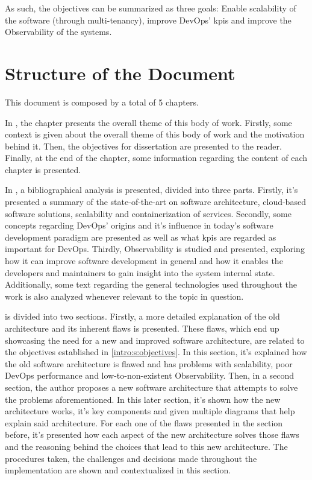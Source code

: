 As such, the objectives can be summarized as three goals: Enable scalability of the software (through multi-tenancy), improve DevOps' \glspl{kpi} and improve the Observability of the systems.


\section{Structure of the Document}\label{intro:s:structure-of-the-document}

This document is composed by a total of 5 chapters.

In , the chapter presents the overall theme of this body of work. Firstly, some context is given about the overall theme of this body of work and the motivation behind it. Then, the objectives for dissertation are presented to the reader. Finally, at the end of the chapter, some information regarding the content of each chapter is presented.

In , a bibliographical analysis is presented, divided into three parts. Firstly, it's presented a summary of the state-of-the-art on software architecture, cloud-based software solutions, scalability and containerization of services. Secondly, some concepts regarding DevOps' origins and it's influence in today's software development paradigm are presented as well as what \glspl{kpi} are regarded as important for DevOps. Thirdly, Observability is studied and presented, exploring how it can improve software development in general and how it enables the developers and maintainers to gain insight into the system internal state. Additionally, some text regarding the general technologies used throughout the work is also analyzed whenever relevant to the topic in question.

 is divided into two sections. Firstly, a more detailed explanation of the old architecture and its inherent flaws is presented. These flaws, which end up showcasing the need for a new and improved software architecture, are related to the objectives established in \cref{intro:s:objectives}. In this section, it's explained how the old software architecture is flawed and has problems with scalability, poor DevOps performance and low-to-non-existent Observability. Then, in a second section, the author proposes a new software architecture that attempts to solve the problems aforementioned. In this later section, it's shown how the new architecture works, it's key components and given multiple diagrams that help explain said architecture. For each one of the flaws presented in the section before, it's presented how each aspect of the new architecture solves those flaws and the reasoning behind the choices that lead to this new architecture. The procedures taken, the challenges and decisions made throughout the implementation are shown and contextualized in this section.

